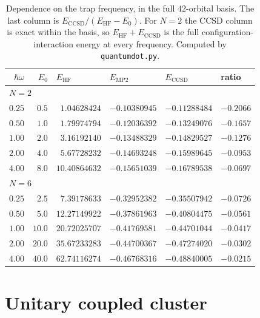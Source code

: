 \begin{table}[h]
\centering
\renewcommand{\arraystretch}{1.25}
\setlength{\tabcolsep}{8pt}
\small
\begin{tabular}{rrllll}
\toprule
$\hbar\omega$ & $E_0$ & $E_{\mathrm{HF}}$ & $E_{\mathrm{MP2}}$ &
$E_{\mathrm{CCSD}}$ & ratio\\
\midrule
\multicolumn{6}{l}{\emph{$N=2$}}\\
$0.25$ & $0.5$  & $\phantom{0}1.04628424$ & $-0.10380945$ & $-0.11288484$ &
  $-0.2066$\\
$0.50$ & $1.0$  & $\phantom{0}1.79974794$ & $-0.12036392$ & $-0.13249076$ &
  $-0.1657$\\
$1.00$ & $2.0$  & $\phantom{0}3.16192140$ & $-0.13488329$ & $-0.14829527$ &
  $-0.1276$\\
$2.00$ & $4.0$  & $\phantom{0}5.67728232$ & $-0.14693248$ & $-0.15989645$ &
  $-0.0953$\\
$4.00$ & $8.0$  & $10.40864632$ & $-0.15651039$ & $-0.16789538$ & $-0.0697$\\
\midrule
\multicolumn{6}{l}{\emph{$N=6$}}\\
$0.25$ & $2.5$  & $\phantom{0}7.39178633$ & $-0.32952382$ & $-0.35507942$ &
  $-0.0726$\\
$0.50$ & $5.0$  & $12.27149922$ & $-0.37861963$ & $-0.40804475$ & $-0.0561$\\
$1.00$ & $10.0$ & $20.72025707$ & $-0.41769581$ & $-0.44701044$ & $-0.0417$\\
$2.00$ & $20.0$ & $35.67233283$ & $-0.44700367$ & $-0.47274020$ & $-0.0302$\\
$4.00$ & $40.0$ & $62.74116274$ & $-0.46768316$ & $-0.48840005$ & $-0.0215$\\
\bottomrule
\end{tabular}
\caption{Dependence on the trap frequency, in the full $42$-orbital basis.
The last column is $E_{\mathrm{CCSD}}/(E_{\mathrm{HF}}-E_0)$.  For $N=2$ the
CCSD column is exact within the basis, so
$E_{\mathrm{HF}}+E_{\mathrm{CCSD}}$ is the full configuration-interaction
energy at every frequency.  Computed by \texttt{quantumdot.py}.}
\label{tab:11-omega}
\end{table}

\section{Unitary coupled cluster}
\label{sec:qducc}

